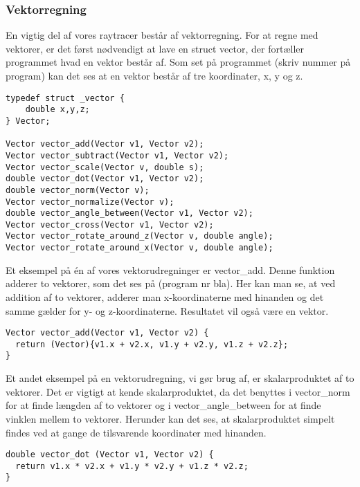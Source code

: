 \subsubsection{Vektorregning}
En vigtig del af vores raytracer består af vektorregning. For at regne med vektorer, er det først nødvendigt at lave en struct vector, der fortæller programmet hvad en vektor består af. Som set på programmet (skriv nummer på program) kan det ses at en vektor består af tre koordinater, x, y og z. 

\begin{lstlisting}[style=Cstyle, caption=Vektorprototyper og struct]
typedef struct _vector {
    double x,y,z;
} Vector;

Vector vector_add(Vector v1, Vector v2);
Vector vector_subtract(Vector v1, Vector v2);
Vector vector_scale(Vector v, double s);
double vector_dot(Vector v1, Vector v2);
double vector_norm(Vector v);
Vector vector_normalize(Vector v);
double vector_angle_between(Vector v1, Vector v2);
Vector vector_cross(Vector v1, Vector v2);
Vector vector_rotate_around_z(Vector v, double angle);
Vector vector_rotate_around_x(Vector v, double angle);

\end{lstlisting}

Et eksempel på én af vores vektorudregninger er vector\_add. Denne funktion adderer to vektorer, som det ses på (program nr bla). Her kan man se, at ved addition af to vektorer, adderer man x-koordinaterne med hinanden og det samme gælder for y- og z-koordinaterne. Resultatet vil også være en vektor.

\begin{lstlisting}[style=Cstyle, caption=vector add]
Vector vector_add(Vector v1, Vector v2) {
  return (Vector){v1.x + v2.x, v1.y + v2.y, v1.z + v2.z};
}

\end{lstlisting}

Et andet eksempel på en vektorudregning, vi gør brug af, er skalarproduktet af to vektorer. Det er vigtigt at kende skalarproduktet, da det benyttes i vector\_norm for at finde længden af to vektorer og i vector\_angle\_between for at finde vinklen mellem to vektorer. Herunder kan det ses, at skalarproduktet simpelt findes ved at gange de tilsvarende koordinater med hinanden.

\begin{lstlisting}[style=Cstyle, caption=vector dot]
double vector_dot (Vector v1, Vector v2) {
  return v1.x * v2.x + v1.y * v2.y + v1.z * v2.z;
}
\end{lstlisting}


